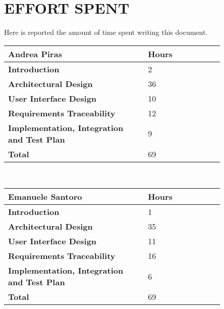 \chapter{EFFORT SPENT}
\label{ch:effort}%
Here is reported the amount of time spent writing this document.
\\[10pt]

\begin{table}[H]
\centering 
    \begin{tabular}{| p{0.55\linewidth} | p{0.30\linewidth} |}
    \hline
    \rowcolor{bluepoli!40}
    \textbf{Andrea Piras} & \textbf{Hours}\T\B \\    
    \hline \hline
    \textbf{Introduction} & 2 \T\B \\
    \hline 
    \textbf{Architectural Design} & 36 \T\B \\
    \hline 
    \textbf{User Interface Design} & 10 \T\B \\
    \hline 
    \textbf{Requirements Traceability} & 12 \T\B \\
    \hline
    \textbf{Implementation, Integration and Test Plan} & 9 \T\B \\
    \hline
    \textbf{Total} & 69 \T\B \\
    \hline    
    \end{tabular}
    \\[10pt]
\end{table}

\begin{table}[H]
\centering 
    \begin{tabular}{| p{0.55\linewidth} | p{0.30\linewidth} |}
    \hline
    \rowcolor{bluepoli!40}
    \textbf{Emanuele Santoro} & \textbf{Hours}\T\B \\    
    \hline \hline
    \textbf{Introduction} & 1 \T\B \\
    \hline 
    \textbf{Architectural Design} & 35 \T\B \\
    \hline 
    \textbf{User Interface Design} & 11 \T\B \\
    \hline 
    \textbf{Requirements Traceability} & 16 \T\B \\
    \hline
    \textbf{Implementation, Integration and Test Plan} & 6 \T\B \\
    \hline
    \textbf{Total} & 69 \T\B \\
    \hline     
    \end{tabular}
    \\[10pt]
\end{table}

